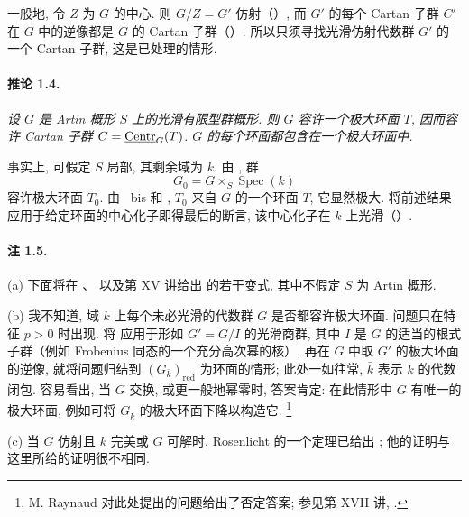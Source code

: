 一般地, 令 \(Z\) 为 \(G\) 的中心. 则 \(G/Z=G'\) 仿射\textup{（）}, 而 \(G'\) 的每个 Cartan 子群 \(C'\) 在 \(G\) 中的逆像都是 \(G\) 的 Cartan 子群\textup{（）}. 所以只须寻找光滑仿射代数群 \(G'\) 的一个 Cartan 子群, 这是已处理的情形.

\paragraph{\textbf{推论 1.4.}}
\emph{设 \(G\) 是 Artin 概形 \(S\) 上的光滑有限型群概形. 则 \(G\) 容许一个极大环面 \(T\), 因而容许 Cartan 子群 \(C=\underline{\operatorname{Centr}}_G(T)\). \(G\) 的每个环面都包含在一个极大环面中.}

事实上, 可假定 \(S\) 局部, 其剩余域为 \(k\). 由 , 群
\[
  G_0=G\times_S\operatorname{Spec}(k)
\]
容许极大环面 \(T_0\). 由 ~bis 和 , \(T_0\) 来自 \(G\) 的一个环面 \(T\), 它显然极大. 将前述结果应用于给定环面的中心化子即得最后的断言, 该中心化子在 \(k\) 上光滑\textup{（）}.

\paragraph{\textbf{注 1.5.}}
\textup{(a)} 下面将在 、 以及第 XV 讲给出  的若干变式, 其中不假定 \(S\) 为 Artin 概形.

\medskip
\noindent\textup{(b)} 我不知道, 域 \(k\) 上每个未必光滑的代数群 \(G\) 是否都容许极大环面. 问题只在特征 \(p>0\) 时出现. 将  应用于形如 \(G'=G/I\) 的光滑商群, 其中 \(I\) 是 \(G\) 的适当的根式子群\textup{（例如 Frobenius 同态的一个充分高次幂的核）}, 再在 \(G\) 中取 \(G'\) 的极大环面的逆像, 就将问题归结到 \((G_{\bar k})_{\mathrm{red}}\) 为环面的情形; 此处一如往常, \(\bar k\) 表示 \(k\) 的代数闭包. 容易看出, 当 \(G\) 交换, 或更一般地幂零时, 答案肯定: 在此情形中 \(G\) 有唯一的极大环面, 例如可将 \(G_{\bar k}\) 的极大环面下降以构造它.\begingroup
\renewcommand{\thefootnote}{*}\footnote{M. Raynaud 对此处提出的问题给出了否定答案; 参见第 XVII 讲, .}
\endgroup

\medskip
\noindent\textup{(c)} 当 \(G\) 仿射且 \(k\) 完美或 \(G\) 可解时, Rosenlicht 的一个定理已给出 ; 他的证明与这里所给的证明很不相同.

